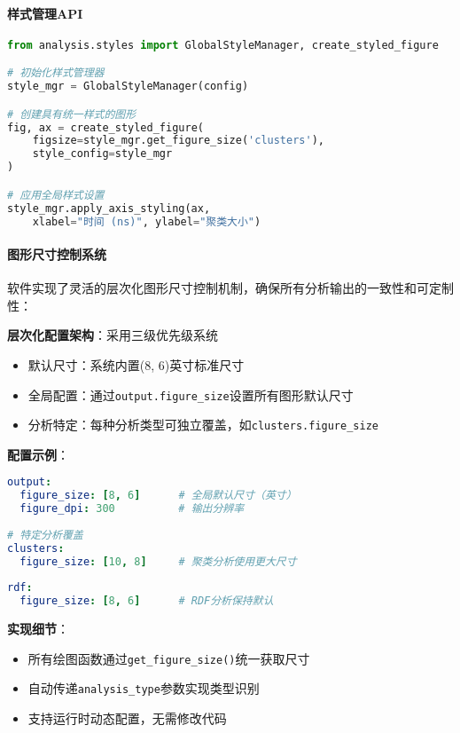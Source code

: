 \paragraph{样式管理API}

\begin{lstlisting}[language=python,style=blockstyle]
from analysis.styles import GlobalStyleManager, create_styled_figure

# 初始化样式管理器
style_mgr = GlobalStyleManager(config)

# 创建具有统一样式的图形
fig, ax = create_styled_figure(
    figsize=style_mgr.get_figure_size('clusters'),
    style_config=style_mgr
)

# 应用全局样式设置
style_mgr.apply_axis_styling(ax, 
    xlabel="时间 (ns)", ylabel="聚类大小")
\end{lstlisting}

\paragraph{图形尺寸控制系统}

软件实现了灵活的层次化图形尺寸控制机制，确保所有分析输出的一致性和可定制性：

\textbf{层次化配置架构}：采用三级优先级系统
\begin{itemize}
    \item 默认尺寸：系统内置(8, 6)英寸标准尺寸
    \item 全局配置：通过\lstinline|output.figure_size|设置所有图形默认尺寸
    \item 分析特定：每种分析类型可独立覆盖，如\lstinline|clusters.figure_size|
\end{itemize}

\textbf{配置示例}：
\begin{lstlisting}[language=yaml,style=blockstyle]
output:
  figure_size: [8, 6]      # 全局默认尺寸（英寸）
  figure_dpi: 300          # 输出分辨率
  
# 特定分析覆盖
clusters:
  figure_size: [10, 8]     # 聚类分析使用更大尺寸
  
rdf:  
  figure_size: [8, 6]      # RDF分析保持默认
\end{lstlisting}

\textbf{实现细节}：
\begin{itemize}
    \item 所有绘图函数通过\lstinline|get_figure_size()|统一获取尺寸
    \item 自动传递\lstinline|analysis_type|参数实现类型识别
    \item 支持运行时动态配置，无需修改代码
\end{itemize}

